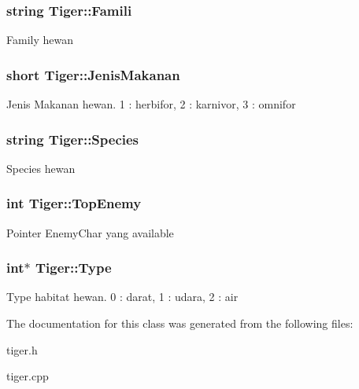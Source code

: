 \subsubsection[{\texorpdfstring{Famili}{Famili}}]{\setlength{\rightskip}{0pt plus 5cm}string Tiger\+::\+Famili\hspace{0.3cm}{\ttfamily [protected]}}\hypertarget{class_tiger_a508ded11631e75ca8def9d08382fe53e}{}\label{class_tiger_a508ded11631e75ca8def9d08382fe53e}
Family hewan 
\subsubsection[{\texorpdfstring{Jenis\+Makanan}{JenisMakanan}}]{\setlength{\rightskip}{0pt plus 5cm}short Tiger\+::\+Jenis\+Makanan\hspace{0.3cm}{\ttfamily [protected]}}\hypertarget{class_tiger_afb03e7b01934b4b95c021986c8ca9dae}{}\label{class_tiger_afb03e7b01934b4b95c021986c8ca9dae}
Jenis Makanan hewan. 1 \+: herbifor, 2 \+: karnivor, 3 \+: omnifor 
\subsubsection[{\texorpdfstring{Species}{Species}}]{\setlength{\rightskip}{0pt plus 5cm}string Tiger\+::\+Species\hspace{0.3cm}{\ttfamily [protected]}}\hypertarget{class_tiger_a8311889e0a734ced0a434b4d244ed0ec}{}\label{class_tiger_a8311889e0a734ced0a434b4d244ed0ec}
Species hewan 
\subsubsection[{\texorpdfstring{Top\+Enemy}{TopEnemy}}]{\setlength{\rightskip}{0pt plus 5cm}int Tiger\+::\+Top\+Enemy\hspace{0.3cm}{\ttfamily [protected]}}\hypertarget{class_tiger_aeb3c4e72880d8be516844dd0898e71f4}{}\label{class_tiger_aeb3c4e72880d8be516844dd0898e71f4}
Pointer Enemy\+Char yang available 
\subsubsection[{\texorpdfstring{Type}{Type}}]{\setlength{\rightskip}{0pt plus 5cm}int$\ast$ Tiger\+::\+Type\hspace{0.3cm}{\ttfamily [protected]}}\hypertarget{class_tiger_afada3a13aec9f2a57bd878686b4de88d}{}\label{class_tiger_afada3a13aec9f2a57bd878686b4de88d}
Type habitat hewan. 0 \+: darat, 1 \+: udara, 2 \+: air 

The documentation for this class was generated from the following files\+:\begin{DoxyCompactItemize}
\item 
tiger.\+h\item 
tiger.\+cpp\end{DoxyCompactItemize}
